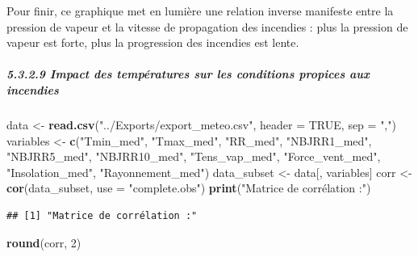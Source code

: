 \documentclass[
]{article}
\newenvironment{Shaded}{\begin{snugshade}}{\end{snugshade}}
\newcommand{\AttributeTok}[1]{\textcolor[rgb]{0.13,0.29,0.53}{#1}}
\newcommand{\ConstantTok}[1]{\textcolor[rgb]{0.56,0.35,0.01}{#1}}
\newcommand{\DecValTok}[1]{\textcolor[rgb]{0.00,0.00,0.81}{#1}}
\newcommand{\FunctionTok}[1]{\textcolor[rgb]{0.13,0.29,0.53}{\textbf{#1}}}
\newcommand{\NormalTok}[1]{#1}
\newcommand{\OtherTok}[1]{\textcolor[rgb]{0.56,0.35,0.01}{#1}}
\newcommand{\StringTok}[1]{\textcolor[rgb]{0.31,0.60,0.02}{#1}}
\begin{document}
Pour finir, ce graphique met en lumière une relation inverse manifeste
entre la pression de vapeur et la vitesse de propagation des incendies :
plus la pression de vapeur est forte, plus la progression des incendies
est lente.

\subparagraph{5.3.2.9 Impact des températures sur les conditions
propices aux
incendies}\label{impact-des-tempuxe9ratures-sur-les-conditions-propices-aux-incendies}

\begin{Shaded}
\begin{Highlighting}[]
\NormalTok{ data }\OtherTok{\textless{}{-}} \FunctionTok{read.csv}\NormalTok{(}\StringTok{"../Exports/export\_meteo.csv"}\NormalTok{, }\AttributeTok{header =} \ConstantTok{TRUE}\NormalTok{, }\AttributeTok{sep =} \StringTok{","}\NormalTok{)}
\NormalTok{  variables }\OtherTok{\textless{}{-}} \FunctionTok{c}\NormalTok{(}\StringTok{"Tmin\_med"}\NormalTok{, }\StringTok{"Tmax\_med"}\NormalTok{, }\StringTok{"RR\_med"}\NormalTok{, }\StringTok{"NBJRR1\_med"}\NormalTok{, }\StringTok{"NBJRR5\_med"}\NormalTok{, }
                 \StringTok{"NBJRR10\_med"}\NormalTok{, }\StringTok{"Tens\_vap\_med"}\NormalTok{, }\StringTok{"Force\_vent\_med"}\NormalTok{, }
                 \StringTok{"Insolation\_med"}\NormalTok{, }\StringTok{"Rayonnement\_med"}\NormalTok{)}
\NormalTok{  data\_subset }\OtherTok{\textless{}{-}}\NormalTok{ data[, variables]}
\NormalTok{  corr }\OtherTok{\textless{}{-}} \FunctionTok{cor}\NormalTok{(data\_subset, }\AttributeTok{use =} \StringTok{"complete.obs"}\NormalTok{)}
  \FunctionTok{print}\NormalTok{(}\StringTok{"Matrice de corrélation :"}\NormalTok{)}
\end{Highlighting}
\end{Shaded}

\begin{verbatim}
## [1] "Matrice de corrélation :"
\end{verbatim}

\begin{Shaded}
\begin{Highlighting}[]
  \FunctionTok{round}\NormalTok{(corr, }\DecValTok{2}\NormalTok{)}
\end{Highlighting}
\end{Shaded}
\end{document}
